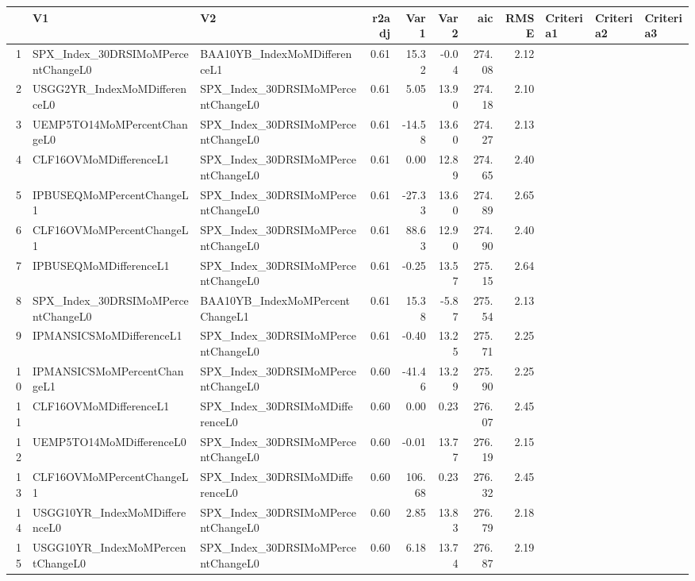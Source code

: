 \begin{longtable}{rllrrrrrlll}
  \hline
 & V1 & V2 & r2adj & Var1 & Var2 & aic & RMSE & Criteria1 & Criteria2 & Criteria3 \\ 
  \hline
1 & SPX\_Index\_30DRSIMoMPercentChangeL0 & BAA10YB\_IndexMoMDifferenceL1 & 0.61 & 15.32 & -0.04 & 274.08 & 2.12 &  &  &  \\ 
  2 & USGG2YR\_IndexMoMDifferenceL0 & SPX\_Index\_30DRSIMoMPercentChangeL0 & 0.61 & 5.05 & 13.90 & 274.18 & 2.10 &  &  &  \\ 
  3 & UEMP5TO14MoMPercentChangeL0 & SPX\_Index\_30DRSIMoMPercentChangeL0 & 0.61 & -14.58 & 13.60 & 274.27 & 2.13 &  &  &  \\ 
  4 & CLF16OVMoMDifferenceL1 & SPX\_Index\_30DRSIMoMPercentChangeL0 & 0.61 & 0.00 & 12.89 & 274.65 & 2.40 &  &  &  \\ 
  5 & IPBUSEQMoMPercentChangeL1 & SPX\_Index\_30DRSIMoMPercentChangeL0 & 0.61 & -27.33 & 13.60 & 274.89 & 2.65 &  &  &  \\ 
  6 & CLF16OVMoMPercentChangeL1 & SPX\_Index\_30DRSIMoMPercentChangeL0 & 0.61 & 88.63 & 12.90 & 274.90 & 2.40 &  &  &  \\ 
  7 & IPBUSEQMoMDifferenceL1 & SPX\_Index\_30DRSIMoMPercentChangeL0 & 0.61 & -0.25 & 13.57 & 275.15 & 2.64 &  &  &  \\ 
  8 & SPX\_Index\_30DRSIMoMPercentChangeL0 & BAA10YB\_IndexMoMPercentChangeL1 & 0.61 & 15.38 & -5.87 & 275.54 & 2.13 &  &  &  \\ 
  9 & IPMANSICSMoMDifferenceL1 & SPX\_Index\_30DRSIMoMPercentChangeL0 & 0.61 & -0.40 & 13.25 & 275.71 & 2.25 &  &  &  \\ 
  10 & IPMANSICSMoMPercentChangeL1 & SPX\_Index\_30DRSIMoMPercentChangeL0 & 0.60 & -41.46 & 13.29 & 275.90 & 2.25 &  &  &  \\ 
  11 & CLF16OVMoMDifferenceL1 & SPX\_Index\_30DRSIMoMDifferenceL0 & 0.60 & 0.00 & 0.23 & 276.07 & 2.45 &  &  &  \\ 
  12 & UEMP5TO14MoMDifferenceL0 & SPX\_Index\_30DRSIMoMPercentChangeL0 & 0.60 & -0.01 & 13.77 & 276.19 & 2.15 &  &  &  \\ 
  13 & CLF16OVMoMPercentChangeL1 & SPX\_Index\_30DRSIMoMDifferenceL0 & 0.60 & 106.68 & 0.23 & 276.32 & 2.45 &  &  &  \\ 
  14 & USGG10YR\_IndexMoMDifferenceL0 & SPX\_Index\_30DRSIMoMPercentChangeL0 & 0.60 & 2.85 & 13.83 & 276.79 & 2.18 &  &  &  \\ 
  15 & USGG10YR\_IndexMoMPercentChangeL0 & SPX\_Index\_30DRSIMoMPercentChangeL0 & 0.60 & 6.18 & 13.74 & 276.87 & 2.19 &  &  &  \\ 

\end{longtable}
